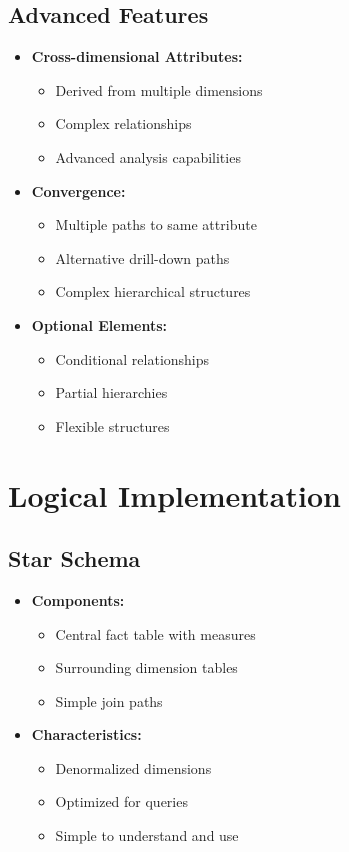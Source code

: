 \subsection{Advanced Features}
\begin{itemize}
    \item \textbf{Cross-dimensional Attributes:}
        \begin{itemize}
            \item Derived from multiple dimensions
            \item Complex relationships
            \item Advanced analysis capabilities
        \end{itemize}
    \item \textbf{Convergence:}
        \begin{itemize}
            \item Multiple paths to same attribute
            \item Alternative drill-down paths
            \item Complex hierarchical structures
        \end{itemize}
    \item \textbf{Optional Elements:}
        \begin{itemize}
            \item Conditional relationships
            \item Partial hierarchies
            \item Flexible structures
        \end{itemize}
\end{itemize}

\section{Logical Implementation}

\subsection{Star Schema}

\begin{itemize}
    \item \textbf{Components:}
        \begin{itemize}
            \item Central fact table with measures
            \item Surrounding dimension tables
            \item Simple join paths
        \end{itemize}
    \item \textbf{Characteristics:}
        \begin{itemize}
            \item Denormalized dimensions
            \item Optimized for queries
            \item Simple to understand and use
        \end{itemize}
\end{itemize}


